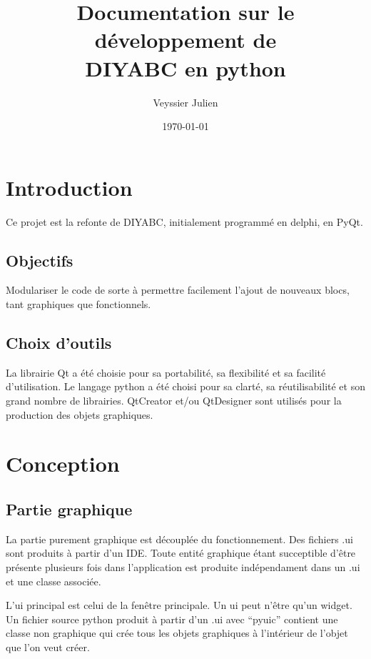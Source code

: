 \documentclass[12pt,a4paper]{article}
\author{Veyssier Julien}
\title{Documentation sur le développement de \\
DIYABC en python}
\date\today
\begin{document}
\maketitle
\newpage

\tableofcontents

\newpage
 

\section{Introduction}
Ce projet est la refonte de DIYABC, initialement programmé en delphi, en PyQt.
	\subsection{Objectifs}
        Modulariser le code de sorte à permettre facilement l'ajout de nouveaux blocs, tant graphiques que fonctionnels.

	\subsection{Choix d'outils}
        La librairie Qt a été choisie pour sa portabilité, sa flexibilité et sa facilité d'utilisation. Le langage python 
        a été choisi pour sa clarté, sa réutilisabilité et son grand nombre de librairies. QtCreator et/ou QtDesigner sont utilisés pour
        la production des objets graphiques.

\section{Conception}
    \subsection{Partie graphique}
        La partie purement graphique est découplée du fonctionnement. Des fichiers .ui sont produits à partir d'un IDE. Toute entité graphique
        étant succeptible d'être présente plusieurs fois dans l'application est produite indépendament dans un .ui et une classe associée.
        
        L'ui principal est celui de la fenêtre principale.
        Un ui peut n'être qu'un widget. Un fichier source python produit à partir d'un .ui avec ``pyuic'' contient une classe non graphique
        qui crée tous les objets graphiques à l'intérieur de l'objet que l'on veut créer.
\end{document}
